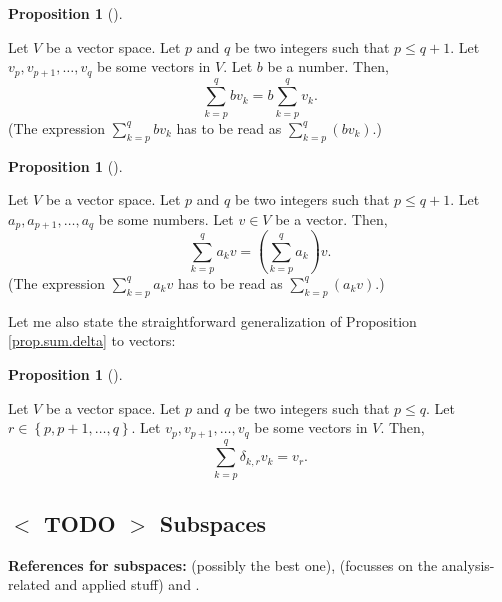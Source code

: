 \documentclass[numbers=enddot,12pt,final,onecolumn,notitlepage]{scrartcl}%
\theoremstyle{definition}
\newtheorem{prop}[theo]{Proposition}
\newenvironment{proposition}[1][]
{\begin{prop}[#1]\begin{leftbar}}
{\end{leftbar}\end{prop}}
\let\sumnonlimits\sum
\renewcommand{\sum}{\sumnonlimits\limits}
\begin{document}
\begin{proposition}
\label{prop.sum.vectors.dist1}Let $V$ be a vector space. Let $p$ and $q$ be
two integers such that $p\leq q+1$. Let $v_{p},v_{p+1},\ldots,v_{q}$ be some
vectors in $V$. Let $b$ be a number. Then,
\[
\sum_{k=p}^{q}bv_{k}=b\sum_{k=p}^{q}v_{k}.
\]
(The expression $\sum_{k=p}^{q}bv_{k}$ has to be read as $\sum_{k=p}%
^{q}\left(  bv_{k}\right)  $.)
\end{proposition}

\begin{proposition}
\label{prop.sum.vectors.dist2}Let $V$ be a vector space. Let $p$ and $q$ be
two integers such that $p\leq q+1$. Let $a_{p},a_{p+1},\ldots,a_{q}$ be some
numbers. Let $v\in V$ be a vector. Then,
\[
\sum_{k=p}^{q}a_{k}v=\left(  \sum_{k=p}^{q}a_{k}\right)  v.
\]
(The expression $\sum_{k=p}^{q}a_{k}v$ has to be read as $\sum_{k=p}%
^{q}\left(  a_{k}v\right)  $.)
\end{proposition}

Let me also state the straightforward generalization of Proposition
\ref{prop.sum.delta} to vectors:

\begin{proposition}
\label{prop.sum.vectors.delta}Let $V$ be a vector space. Let $p$ and $q$ be
two integers such that $p\leq q$. Let $r\in\left\{  p,p+1,\ldots,q\right\}  $.
Let $v_{p},v_{p+1},\ldots,v_{q}$ be some vectors in $V$. Then,%
\[
\sum_{k=p}^{q}\delta_{k,r}v_{k}=v_{r}.
\]

\end{proposition}

\subsection{%
$<$%
TODO%
$>$
Subspaces}

\textbf{References for subspaces:} \cite[\S 4.3]{LaNaSc16} (possibly the best
one), \cite[\S 2.2]{OlvSha06} (focusses on the analysis-related and applied
stuff) and \cite[Two.I.2]{Heffer16}.
\end{document}
